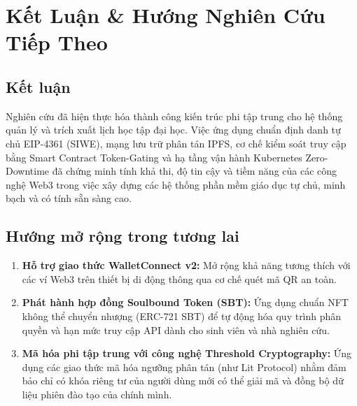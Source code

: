 \documentclass[11pt,a4paper]{article}
\begin{document}
\section{Kết Luận \& Hướng Nghiên Cứu Tiếp Theo}

\subsection{Kết luận}
Nghiên cứu đã hiện thực hóa thành công kiến trúc phi tập trung cho hệ thống quản lý và trích xuất lịch học tập đại học. Việc ứng dụng chuẩn định danh tự chủ EIP-4361 (SIWE), mạng lưu trữ phân tán IPFS, cơ chế kiểm soát truy cập bằng Smart Contract Token-Gating và hạ tầng vận hành Kubernetes Zero-Downtime đã chứng minh tính khả thi, độ tin cậy và tiềm năng của các công nghệ Web3 trong việc xây dựng các hệ thống phần mềm giáo dục tự chủ, minh bạch và có tính sẵn sàng cao.

\subsection{Hướng mở rộng trong tương lai}
\begin{enumerate}
    \item \textbf{Hỗ trợ giao thức WalletConnect v2:} Mở rộng khả năng tương thích với các ví Web3 trên thiết bị di động thông qua cơ chế quét mã QR an toàn.
    \item \textbf{Phát hành hợp đồng Soulbound Token (SBT):} Ứng dụng chuẩn NFT không thể chuyển nhượng (ERC-721 SBT) để tự động hóa quy trình phân quyền và hạn mức truy cập API dành cho sinh viên và nhà nghiên cứu.
    \item \textbf{Mã hóa phi tập trung với công nghệ Threshold Cryptography:} Ứng dụng các giao thức mã hóa ngưỡng phân tán (như Lit Protocol) nhằm đảm bảo chỉ có khóa riêng tư của người dùng mới có thể giải mã và đồng bộ dữ liệu phiên đào tạo của chính mình.
\end{enumerate}

\newpage


\end{document}

